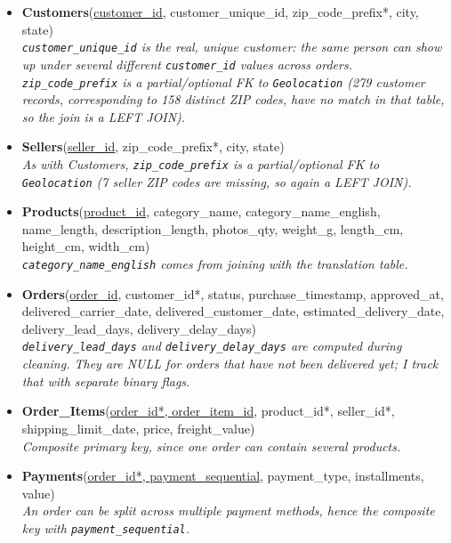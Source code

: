 \documentclass[12pt,a4paper]{article}
\begin{document}
\begin{itemize}
  \item \textbf{Customers}(\underline{customer\_id}, customer\_unique\_id,
        zip\_code\_prefix*, city, state)\\
        \textit{\texttt{customer\_unique\_id} is the real, unique customer: the same
        person can show up under several different \texttt{customer\_id} values across
        orders. \texttt{zip\_code\_prefix} is a partial/optional FK to
        \texttt{Geolocation} (279 customer records, corresponding to 158 distinct ZIP
        codes, have no match in that table, so the join is a LEFT JOIN).}

  \item \textbf{Sellers}(\underline{seller\_id}, zip\_code\_prefix*, city, state)\\
        \textit{As with Customers, \texttt{zip\_code\_prefix} is a partial/optional FK
        to \texttt{Geolocation} (7 seller ZIP codes are missing, so again a LEFT
        JOIN).}

  \item \textbf{Products}(\underline{product\_id}, category\_name,
        category\_name\_english, name\_length, description\_length, photos\_qty,
        weight\_g, length\_cm, height\_cm, width\_cm)\\
        \textit{\texttt{category\_name\_english} comes from joining with the
        translation table.}

  \item \textbf{Orders}(\underline{order\_id}, customer\_id*, status,
        purchase\_timestamp, approved\_at, delivered\_carrier\_date,
        delivered\_customer\_date, estimated\_delivery\_date,
        delivery\_lead\_days, delivery\_delay\_days)\\
        \textit{\texttt{delivery\_lead\_days} and \texttt{delivery\_delay\_days} are
        computed during cleaning. They are NULL for orders that have not been
        delivered yet; I track that with separate binary flags.}

  \item \textbf{Order\_Items}(\underline{order\_id*, order\_item\_id}, product\_id*,
        seller\_id*, shipping\_limit\_date, price, freight\_value)\\
        \textit{Composite primary key, since one order can contain several products.}

  \item \textbf{Payments}(\underline{order\_id*, payment\_sequential},
        payment\_type, installments, value)\\
        \textit{An order can be split across multiple payment methods, hence the
        composite key with \texttt{payment\_sequential}.}


\end{itemize}
\end{document}
